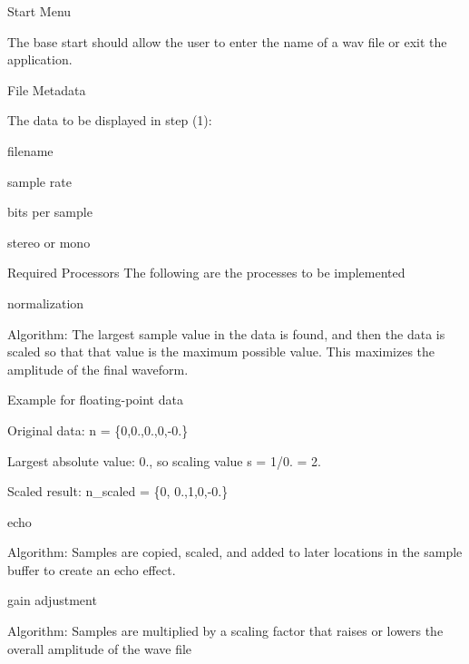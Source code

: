 Start Menu

The base start should allow the user to enter the name of a wav file or exit the application.

File Metadata

The data to be displayed in step (1)\+:


\begin{DoxyItemize}
\item filename
\item sample rate
\item bits per sample
\item stereo or mono
\end{DoxyItemize}

Required Processors The following are the processes to be implemented


\begin{DoxyItemize}
\item normalization
\begin{DoxyItemize}
\item Algorithm\+: The largest sample value in the data is found, and then the data is scaled so that that value is the maximum possible value. This maximizes the amplitude of the final waveform.
\begin{DoxyItemize}
\item Example for floating-\/point data
\begin{DoxyItemize}
\item Original data\+: n = \{0,0.,0.,0,-\/0.\}
\item Largest absolute value\+: 0., so scaling value s = 1/0. = 2.
\item Scaled result\+: n\+\_\+scaled = \{0, 0.,1,0,-\/0.\}
\end{DoxyItemize}
\end{DoxyItemize}
\end{DoxyItemize}
\item echo
\begin{DoxyItemize}
\item Algorithm\+: Samples are copied, scaled, and added to later locations in the sample buffer to create an echo effect.
\end{DoxyItemize}
\item gain adjustment
\begin{DoxyItemize}
\item Algorithm\+: Samples are multiplied by a scaling factor that raises or lowers the overall amplitude of the wave file
\end{DoxyItemize}
\end{DoxyItemize}

